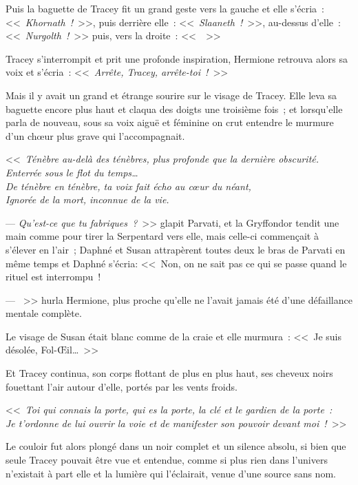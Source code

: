 Puis la baguette de Tracey fit un grand geste vers la gauche et elle s'écria~: <<~\emph{Khornath~!}~>>, puis derrière elle~: <<~\emph{Slaaneth~!}~>>, au-dessus d'elle~: <<~\emph{Nurgolth~!}~>> puis, vers la droite~: <<~~>>

Tracey s'interrompit et prit une profonde inspiration, Hermione retrouva alors sa voix et s'écria~: <<~\emph{Arrête, Tracey, arrête-toi~!}~>>

Mais il y avait un grand et étrange sourire sur le visage de Tracey. Elle leva sa baguette encore plus haut et claqua des doigts une troisième fois~; et lorsqu'elle parla de nouveau, sous sa voix aiguë et féminine on crut entendre le murmure d'un chœur plus grave qui l'accompagnait.

<<~\emph{Ténèbre au-delà des ténèbres, plus profonde que la dernière obscurité.\\
Enterrée sous le flot du temps…\\
De ténèbre en ténèbre, ta voix fait écho au cœur du néant,\\
Ignorée de la mort, inconnue de la vie.}

--- \emph{Qu'est-ce que tu fabriques~?}~>> glapit Parvati, et la Gryffondor tendit une main comme pour tirer la Serpentard vers elle, mais celle-ci commençait à s'élever en l'air~; Daphné et Susan attrapèrent toutes deux le bras de Parvati en même temps et Daphné s'écria: <<~Non, on ne sait pas ce qui se passe quand le rituel est interrompu~!

--- ~>> hurla Hermione, plus proche qu'elle ne l'avait jamais été d'une défaillance mentale complète.

Le visage de Susan était blanc comme de la craie et elle murmura~: <<~Je suis désolée, Fol-Œil…~>>

Et Tracey continua, son corps flottant de plus en plus haut, ses cheveux noirs fouettant l'air autour d'elle, portés par les vents froids.

<<~\emph{Toi qui connais la porte, qui es la porte, la clé et le gardien de la porte~:\\ Je t'ordonne de lui ouvrir la voie et de manifester son pouvoir devant moi~!}~>>

Le couloir fut alors plongé dans un noir complet et un silence absolu, si bien que seule Tracey pouvait être vue et entendue, comme si plus rien dans l'univers n'existait à part elle et la lumière qui l'éclairait, venue d'une source sans nom.


